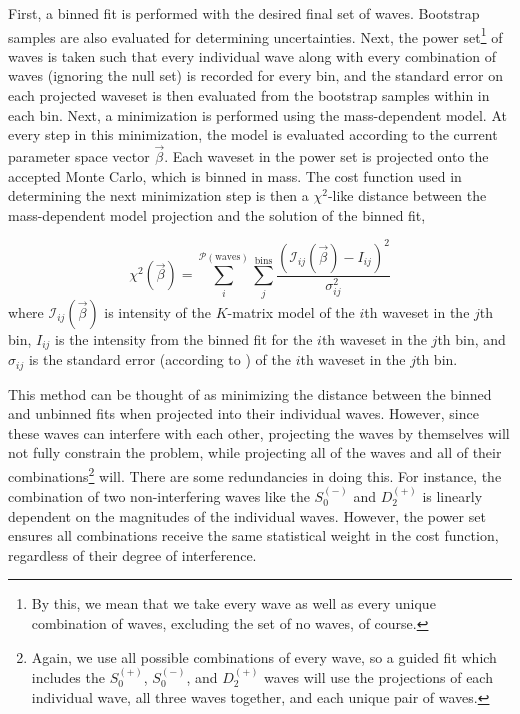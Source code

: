 First, a binned fit is performed with the desired final set of waves. Bootstrap samples are also evaluated for determining uncertainties. Next, the power set\footnote{By this, we mean that we take every wave as well as every unique combination of waves, excluding the set of no waves, of course.} of waves is taken such that every individual wave along with every combination of waves (ignoring the null set) is recorded for every bin, and the standard error on each projected waveset is then evaluated from the bootstrap samples within in each bin. Next, a minimization is performed using the mass-dependent model. At every step in this minimization, the model is evaluated according to the current parameter space vector $\vec{\beta}$. Each waveset in the power set is projected onto the accepted Monte Carlo, which is binned in mass. The cost function used in determining the next minimization step is then a $\chi^2$-like distance between the mass-dependent model projection and the solution of the binned fit,

\begin{equation}
  \chi^2(\vec{\beta}) = \sum_i^{\mathcal{P}(\text{waves})} \sum_j^{\text{bins}} \frac{(\mathcal{I}_{ij}(\vec{\beta}) - I_{ij})^2}{\sigma_{ij}^2}
\end{equation}
where $\mathcal{I}_{ij}(\vec{\beta})$ is intensity of the $K$-matrix model of the $i$th waveset in the $j$th bin, $I_{ij}$ is the intensity from the binned fit for the $i$th waveset in the $j$th bin, and $\sigma_{ij}$ is the standard error (according to ) of the $i$th waveset in the $j$th bin.

This method can be thought of as minimizing the distance between the binned and unbinned fits when projected into their individual waves. However, since these waves can interfere with each other, projecting the waves by themselves will not fully constrain the problem, while projecting all of the waves and all of their combinations\footnote{Again, we use all possible combinations of every wave, so a guided fit which includes the $S_0^{(+)}$, $S_0^{(-)}$, and $D_2^{(+)}$ waves will use the projections of each individual wave, all three waves together, and each unique pair of waves.} will. There are some redundancies in doing this. For instance, the combination of two non-interfering waves like the $S_0^{(-)}$ and $D_2^{(+)}$ is linearly dependent on the magnitudes of the individual waves. However, the power set ensures all combinations receive the same statistical weight in the cost function, regardless of their degree of interference.


